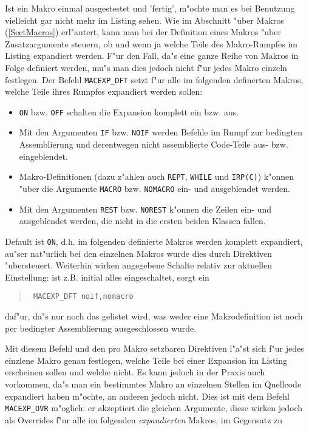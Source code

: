 \documentclass[12pt,a4paper,twoside]{report}
\newcommand{\tty}[1]{{\tt #1}}
\begin{document}
Ist ein Makro einmal ausgestestet und 'fertig', m"ochte man es bei
Benutzung vielleicht gar nicht mehr im Listing sehen.  Wie im
Abschnitt "uber Makros (\ref{SectMacros}) erl"autert, kann man bei der
Definition eines Makros "uber Zusatzargumente steuern, ob und wenn ja
welche Teile des Makro-Rumpfes im Listing expandiert werden.  F"ur den
Fall, da"s eine ganze Reihe von Makros in Folge definiert werden,
mu"s man dies jedoch nicht f"ur jedes Makro einzeln festlegen.  Der
Befehl \tty{MACEXP\_DFT} setzt f"ur alle im folgenden definerten Makros,
welche Teile ihres Rumpfes expandiert werden sollen:
\begin{itemize}
\item{\tty{ON} bzw. \tty{OFF} schalten die Expansion komplett
      ein bzw. aus.}
\item{Mit den Argumenten \tty{IF} bzw. \tty{NOIF} werden Befehle
      im Rumpf zur bedingten Assemblierung und derentwegen nicht
      assemblierte Code-Teile aus- bzw. eingeblendet.}
\item{Makro-Definitionen (dazu z"ahlen auch \tty{REPT},
      \tty{WHILE} und \tty{IRP(C)}) k"onnen "uber die Argumente
      \tty{MACRO} bzw. \tty{NOMACRO} ein- und
      ausgeblendet werden.}
\item{Mit den Argumenten \tty{REST} bzw. \tty{NOREST} k"onnen die
      Zeilen ein- und ausgeblendet werden, die nicht in die ersten
      beiden Klassen fallen.}
\end{itemize}
Default ist \tty{ON}, d.h. im folgenden definierte Makros werden
komplett expandiert, au"ser nat"urlich bei den einzelnen Makros wurde
dies durch Direktiven "ubersteuert.  Weiterhin wirken angegebene Schalte
relativ zur aktuellen Einstellung: ist z.B. initial alles eingeschaltet,
sorgt ein
\begin{quote}{\tt
        MACEXP\_DFT  noif,nomacro
}\end{quote}
daf"ur, da"s nur noch das gelistet wird, was weder eine Makrodefinition
ist noch per bedingter Assemblierung ausgeschlossen wurde.
\par
Mit diesem Befehl und den pro Makro setzbaren Direktiven l"a"st sich
f"ur jedes einzlene Makro genau festlegen, welche Teile bei einer
Expansion im Listing erscheinen sollen und welche nicht.  Es kann
jedoch in der Praxis auch vorkommen, da"s man ein bestimmtes Makro an
einzelnen Stellen im Quellcode expandiert haben m"ochte, an anderen
jedoch nicht.  Dies ist mit dem Befehl \tty{MACEXP\_OVR} m"oglich: er
akzeptiert die gleichen Argumente, diese wirken jedoch als Overrides
f"ur alle im folgenden {\em expandierten} Makros, im Gegensatz zu
\end{document}
